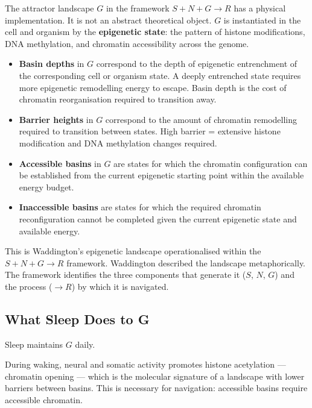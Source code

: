 \documentclass[10pt, a4paper]{article}
\begin{document}
The attractor landscape $G$ in the
framework $S + N + G \rightarrow R$
has a physical implementation. It is
not an abstract theoretical object.
$G$ is instantiated in the cell and
organism by the \textbf{epigenetic
state}: the pattern of histone
modifications, DNA methylation, and
chromatin accessibility across the
genome.

\begin{itemize}[itemsep=0.2em]
  \item \textbf{Basin depths} in $G$
    correspond to the depth of
    epigenetic entrenchment of the
    corresponding cell or organism
    state. A deeply entrenched state
    requires more epigenetic remodelling
    energy to escape. Basin depth is
    the cost of chromatin reorganisation
    required to transition away.

  \item \textbf{Barrier heights} in $G$
    correspond to the amount of
    chromatin remodelling required to
    transition between states. High
    barrier = extensive histone
    modification and DNA methylation
    changes required.

  \item \textbf{Accessible basins} in
    $G$ are states for which the
    chromatin configuration can be
    established from the current
    epigenetic starting point within
    the available energy budget.

  \item \textbf{Inaccessible basins}
    are states for which the required
    chromatin reconfiguration cannot
    be completed given the current
    epigenetic state and available
    energy.
\end{itemize}

This is Waddington's epigenetic
landscape operationalised within the
$S + N + G \rightarrow R$ framework.
Waddington described the landscape
metaphorically. The framework identifies
the three components that generate it
($S$, $N$, $G$) and the process
($\rightarrow R$) by which it is
navigated.

\subsection{What Sleep Does to G}

Sleep maintains $G$ daily.

During waking, neural and somatic
activity promotes histone acetylation
--- chromatin opening --- which is the
molecular signature of a landscape with
lower barriers between basins.
This is necessary for navigation:
accessible basins require accessible
chromatin.
\end{document}

